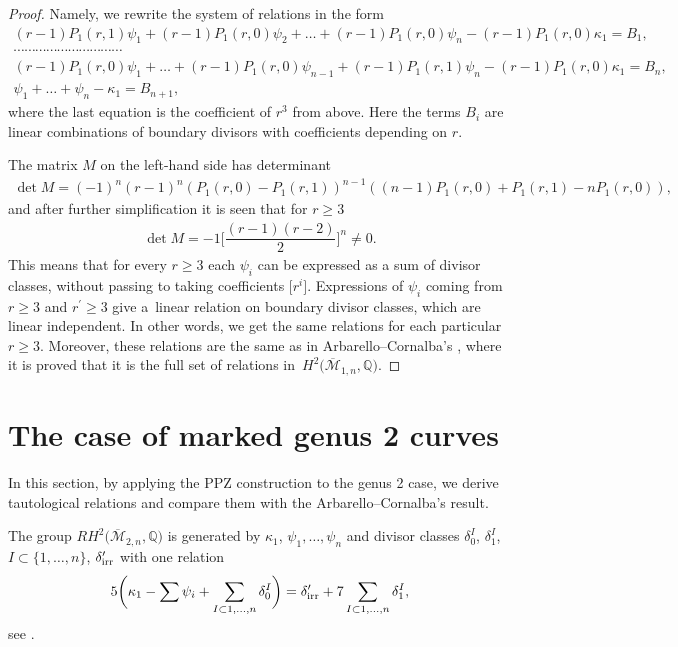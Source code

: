 \documentclass[10pt,a4paper]{amsart}
\def\oM{\overline{\mathcal{M}}}
\numberwithin{equation}{section}
\begin{document}
\begin{proof}
Namely, we rewrite the system of relations in the form
\begin{gather*}
(r-1)P_1(r,1)\psi_1+(r-1)P_1(r,0)\psi_2+\dots+(r-1)P_1(r,0)\psi_n -(r-1)P_1(r,0)\kappa_1 =B_1,
\\
\cdots\cdots\cdots\cdots\cdots\cdots\cdots\cdots\cdots\cdots
\\
(r-1)P_1(r,0)\psi_1 + \dots + (r-1)P_1(r,0)\psi_{n-1}\!+(r-1)P_1(r,1)\psi_n\!-(r-1)P_1(r,0)\kappa_1 =B_n,
\\
\psi_1 +\dots+ \psi_n - \kappa_1 = B_{n+1},
\end{gather*}
where the last equation is the coefficient of $r^3$ from above.
Here the terms $B_i$ are linear combinations of boundary divisors with coefficients depending on $r$.

The matrix $M$ on the left-hand side has determinant
\begin{align*}
\det M = (-1)^n(r-1)^{n}(P_1(r,0) - P_1(r,1))^{n-1}((n-1)P_1(r,0) + P_1(r,1)- nP_1(r,0)),
\end{align*}
and after further simplification it is seen that for $ r \geq 3$
\begin{align*}
\det M= -1\Bigg[\dfrac{(r-1)(r-2)}{2}\Bigg]^n \neq 0.
\end{align*}
This means that for every $r\geq3$ each $\psi_i$ can be expressed as a sum of divisor classes, without passing to taking coefficients $\big[r^i\big]$. Expressions of $\psi_i$ coming from $r\geq3$ and $r^{\prime}\geq3$ give a~linear relation on boundary divisor classes, which are linear independent. In other words,
we get the same relations for each particular $r\geq3$. Moreover, these relations are the same as in Arbarello--Cornalba's \cite[Theorem 2.2]{Cor}, where it is proved that it is the full set of relations in~$H^2\big(\oM_{1,n},\mathbb{Q}\big)$.
\end{proof}


\section{The case of marked genus 2 curves}
In this section, by applying the PPZ construction to the genus 2 case, we derive tautological relations and compare them with the Arbarello--Cornalba's result.

The group $RH^2\big(\oM_{2,n},\mathbb{Q}\big)$ is generated by $\kappa_1$, $\psi_1,\dots,\psi_n$ and divisor classes $\delta_0^I$, $\delta_1^I$, $I\subset\{1,\dots,n\}$, $\delta^{\prime}_{\rm irr}$ with one relation
\begin{align*}
	5\bigg(\kappa_1 - \sum \psi_i + \sum_{I\subset{1,\dots,n}}\delta_0^{I}\bigg) = \delta_{\rm irr}^{\prime} + 7\sum_{I\subset{1,\dots,n}}\delta_1^{I},
\end{align*}
see \cite[Theorem 2.2]{Cor}.
\end{document}
